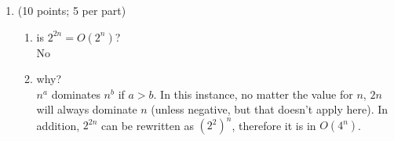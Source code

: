 \documentclass{article}
\begin{document}
    \begin{enumerate}[label=\textbf{Q4}]
        \item (10 points; 5 per part)
        \begin{enumerate}[label=(\alph*)]
            \item is $2^{2n} = O(2^n)$?\\
            No
            \item why?\\
            $n^a$ dominates $n^b$ if $a > b$. In this instance, no matter the value for $n$, $2n$ will always
            dominate $n$ (unless negative, but that doesn't apply here). In addition, $2^{2n}$ can be rewritten 
            as $(2^2)^n$, therefore it is in $O(4^n)$.
        \end{enumerate}
    \end{enumerate}
\end{document}
